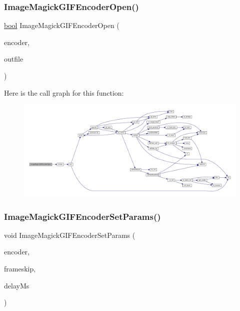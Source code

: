 \subsubsection{\texorpdfstring{Image\+Magick\+G\+I\+F\+Encoder\+Open()}{ImageMagickGIFEncoderOpen()}}
{\footnotesize\ttfamily \mbox{\hyperlink{libretro_8h_a4a26dcae73fb7e1528214a068aca317e}{bool}} Image\+Magick\+G\+I\+F\+Encoder\+Open (\begin{DoxyParamCaption}\item[{struct \mbox{\hyperlink{imagemagick-gif-encoder_8h_struct_image_magick_g_i_f_encoder}{Image\+Magick\+G\+I\+F\+Encoder}} $\ast$}]{encoder,  }\item[{const char $\ast$}]{outfile }\end{DoxyParamCaption})}

Here is the call graph for this function\+:
\nopagebreak
\begin{figure}[H]
\begin{center}
\leavevmode
\includegraphics[width=350pt]{imagemagick-gif-encoder_8c_ad1c19071d722aa4826774e1f179b3f57_cgraph}
\end{center}
\end{figure}
\mbox{\label{imagemagick-gif-encoder_8c_a40b53230d8a8b3b36048085d06d9d029}} 
\subsubsection{\texorpdfstring{Image\+Magick\+G\+I\+F\+Encoder\+Set\+Params()}{ImageMagickGIFEncoderSetParams()}}
{\footnotesize\ttfamily void Image\+Magick\+G\+I\+F\+Encoder\+Set\+Params (\begin{DoxyParamCaption}\item[{struct \mbox{\hyperlink{imagemagick-gif-encoder_8h_struct_image_magick_g_i_f_encoder}{Image\+Magick\+G\+I\+F\+Encoder}} $\ast$}]{encoder,  }\item[{\mbox{\hyperlink{ioapi_8h_a787fa3cf048117ba7123753c1e74fcd6}{int}}}]{frameskip,  }\item[{\mbox{\hyperlink{ioapi_8h_a787fa3cf048117ba7123753c1e74fcd6}{int}}}]{delay\+Ms }\end{DoxyParamCaption})}

